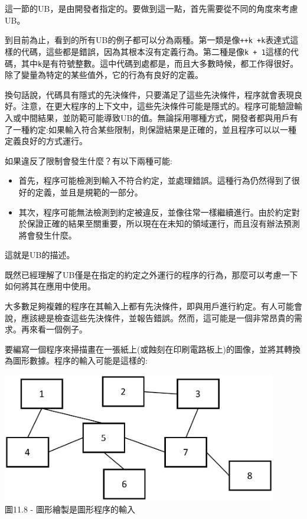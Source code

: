 這一節的UB，是由開發者指定的。要做到這一點，首先需要從不同的角度來考慮UB。 

到目前為止，看到的所有UB的例子都可以分為兩種。第一類是像\texttt{++k +k}表達式這樣的代碼，這些都是錯誤，因為其根本沒有定義行為。第二種是像\texttt{k + 1}這樣的代碼，其中\texttt{k}是有符號整數。這中代碼到處都是，而且大多數時候，都工作得很好。除了變量為特定的某些值外，它的行為有良好的定義。

換句話說，代碼具有隱式的先決條件，只要滿足了這些先決條件，程序就會表現良好。注意，在更大程序的上下文中，這些先決條件可能是隱式的。程序可能驗證輸入或中間結果，並防範可能導致UB的值。無論採用哪種方式，開發者都與用戶有了一種約定:如果輸入符合某些限制，則保證結果是正確的，並且程序可以以一種定義良好的方式運行。

如果違反了限制會發生什麼？有以下兩種可能:

\begin{itemize}
\item 
首先，程序可能檢測到輸入不符合約定，並處理錯誤。這種行為仍然得到了很好的定義，並且是規範的一部分。

\item 
其次，程序可能無法檢測到約定被違反，並像往常一樣繼續進行。由於約定對於保證正確的結果至關重要，所以現在在未知的領域運行，而且沒有辦法預測將會發生什麼。
\end{itemize}

這就是UB的描述。

既然已經理解了UB僅是在指定的約定之外運行的程序的行為，那麼可以考慮一下如何將其在應用中使用。

大多數足夠複雜的程序在其輸入上都有先決條件，即與用戶進行約定。有人可能會說，應該總是檢查這些先決條件，並報告錯誤。然而，這可能是一個非常昂貴的需求。再來看一個例子。

要編寫一個程序來掃描畫在一張紙上(或蝕刻在印刷電路板上)的圖像，並將其轉換為圖形數據。程序的輸入可能是這樣的:

\begin{center}
\includegraphics[width=0.9\textwidth]{content/3/chapter11/images/8.jpg}\\
圖11.8 - 圖形繪製是圖形程序的輸入
\end{center}

